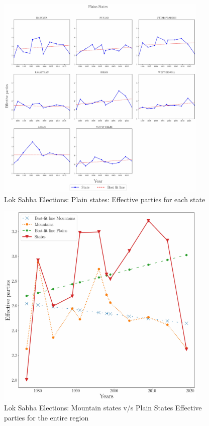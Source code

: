 \begin{figure}[htbp]
    \centering
    \includegraphics[width=0.9\textwidth]{figures/lok/plains_states.pdf}
    \caption{Lok Sabha Elections: Plain states: Effective parties for each state}
    \label{img:plain_enp}
\end{figure}

\begin{figure}[htbp]
    \centering
    \includegraphics[width=0.9\textwidth]{figures/lok/final.pdf}
    \caption{Lok Sabha Elections: Mountain states v/s Plain States Effective parties for the entire region}
    \label{img:overall_enp}
\end{figure}

